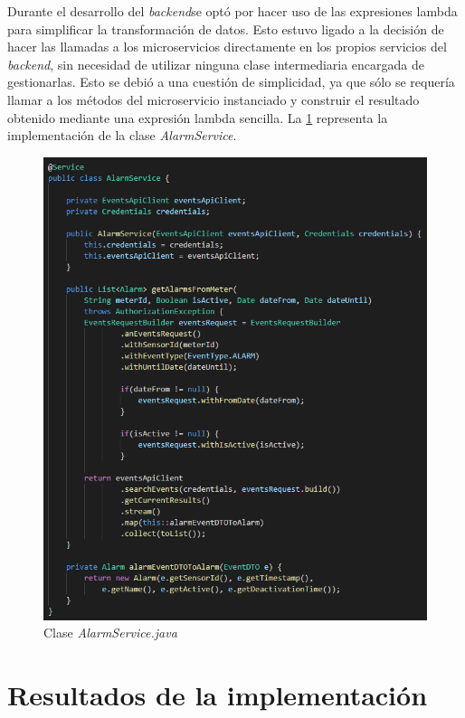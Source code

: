 \documentclass[pdftex,11pt,a4paper]{book}
\begin{document}
Durante el desarrollo del \textit{backend}se optó por hacer uso de las expresiones lambda para simplificar la transformación de datos. Esto estuvo ligado a la decisión de hacer las llamadas a los microservicios directamente en los propios servicios del \textit{backend}, sin necesidad de utilizar ninguna clase intermediaria encargada de gestionarlas. Esto se debió a una cuestión de simplicidad, ya que sólo se requería llamar a los métodos del microservicio instanciado y construir el resultado obtenido mediante una expresión lambda sencilla. La \ref{fig:watermeter-service-java} representa la implementación de la clase \textit{AlarmService}. 

\begin{figure}[H]
 \centering
 \includegraphics [scale=0.90] {images/implementacion/watermeter-service-java.png}
 \caption{Clase \textit{AlarmService.java}} \label{fig:watermeter-service-java}
 \end{figure}


\section{Resultados de la implementación}
\end{document}
